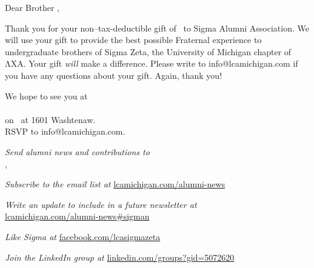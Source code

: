 \documentclass{article}
\begin{document}
\vspace{1in}

Dear Brother \donorLastName,

Thank you for your non–tax-deductible gift of \donationAmount\ to Sigma Alumni
Association. We will use your gift to provide the best possible Fraternal
experience to undergraduate brothers of Sigma Zeta, the University of Michigan
chapter of ΛΧΑ. Your gift \emph{will} make a difference. Please write to
info@lcamichigan.com if you have any questions about your gift. Again, thank
you!

\vfill

{\fontsize{14}{22}\selectfont{}
  We hope to see you at\\[8bp]
  {\sffamily\fontsize{24}{24}\selectfont{}
    \MakeUppercase{\eventName}%
  }\\
  on \eventDate\ at 1601 Washtenaw.\\
  RSVP to info@lcamichigan.com.\par
}

\vspace{0.25in}

\emph{Send alumni news and contributions to\\}
\SigmaStreet, \SigmaCityStateAndZIP

\emph{Subscribe to the email list at} \url{lcamichigan.com/alumni-news}

\emph{Write an update to include in a future newsletter at\\}
\url{lcamichigan.com/alumni-news#sigman}

\emph{Like Sigma at} \url{facebook.com/lcasigmazeta}

\emph{Join the LinkedIn group at} \url{linkedin.com/groups?gid=5072620}

\iffalse
\newlength\windowMinX
\windowMinX0.375in
\begin{tikzpicture}[remember picture,overlay]
  \begin{scope}[lightgray]
    \draw
      ([shift={(\windowMinX, -\topWindowMinY)}]current page.north west) rectangle
      ([shift={(\windowMinX + \topWindowWidth, -(\topWindowMinY + \topWindowHeight))}]current page.north west);
    \draw
      ([shift={(\windowMinX, -\bottomWindowMinY)}]current page.north west) rectangle
      ([shift={(\windowMinX + \bottomWindowWidth, -(\bottomWindowMinY + \bottomWindowHeight))}]current page.north west);
  \end{scope}
\end{tikzpicture}
\fi
\end{document}
